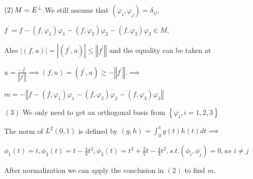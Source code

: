 \documentclass{article}
\begin{document}
$\bigskip \left( 2\right) M=E^{\bot }.$We still assume that $\left( \varphi
_{i},\varphi _{j}\right) =\delta _{ij},$

$f^{\prime }=f-\left( f,\varphi _{1}\right) \varphi _{1}-\left( f,\varphi
_{2}\right) \varphi _{2}-\left( f,\varphi _{3}\right) \varphi _{3}\in M,$

Also $\left\vert \left( f,u\right) \right\vert =\left\vert \left( f^{\prime
},u\right) \right\vert \leq \left\Vert f^{\prime }\right\Vert $ and the
equality can be taken at

$u=\frac{-f^{\prime }}{\left\Vert f^{\prime }\right\Vert }\implies \left(
f,u\right) =\left( f^{\prime },u\right) \geq -\left\Vert f^{\prime
}\right\Vert .\implies $

$m=-\left\Vert f-\left( f,\varphi _{1}\right) \varphi _{1}-\left( f,\varphi
_{2}\right) \varphi _{2}-\left( f,\varphi _{3}\right) \varphi
_{3}\right\Vert $

$\left( 3\right) $ We only need to get an orthogonal basis from $\left\{
\varphi _{i},i=1,2,3\right\} $

The norm of $L^{2}\left( 0,1\right) $ is defined by $\left( g,h\right)
=\int_{0}^{1}g\left( t\right) h\left( t\right) dt\implies $

$\phi _{1}\left( t\right) =t,\phi _{2}\left( t\right) =t-\frac{4}{3}%
t^{2},\phi _{3}\left( t\right) =t^{3}+\frac{2}{5}t-\frac{4}{3}%
t^{2},s.t.\left( \phi _{i},\phi _{j}\right) =0,as$ $i\neq j$

After normalization we can apply the conclusion in $\left( 2\right) $ to
find $m.$
\end{document}
